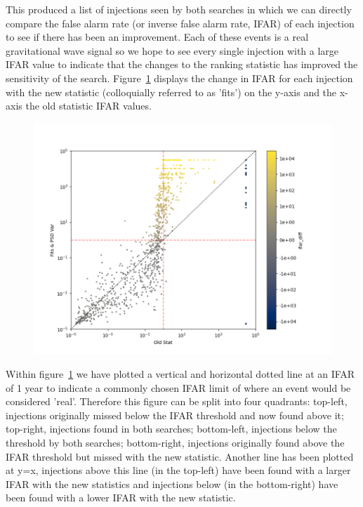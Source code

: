 This produced a list of injections seen by both searches in which we can directly compare the false alarm rate (or inverse false alarm rate, IFAR) of each injection to see if there has been an improvement. Each of these events is a real gravitational wave signal so we hope to see every single injection with a large IFAR value to indicate that the changes to the ranking statistic has improved the sensitivity of the search. Figure~\ref{fig:pycbclive-ifar-vs-ifar} displays the change in IFAR for each injection with the new statistic (colloquially referred to as 'fits') on the y-axis and the x-axis the old statistic IFAR values.
%
\begin{figure}
       \centering
    \includegraphics[width=1.2\textwidth]{images/pycbclive/fits_vs_old_colour.png}
    \caption{}
    \label{fig:pycbclive-ifar-vs-ifar}
\end{figure}
%
Within figure~\ref{fig:pycbclive-ifar-vs-ifar} we have plotted a vertical and horizontal dotted line at an IFAR of 1 year to indicate a commonly chosen IFAR limit of where an event would be considered 'real'. Therefore this figure can be split into four quadrants: top-left, injections originally missed below the IFAR threshold and now found above it; top-right, injections found in both searches; bottom-left, injections below the threshold by both searches; bottom-right, injections originally found above the IFAR threshold but missed with the new statistic. Another line has been plotted at y=x, injections above this line (in the top-left) have been found with a larger IFAR with the new statistics and injections below (in the bottom-right) have been found with a lower IFAR with the new statistic.


